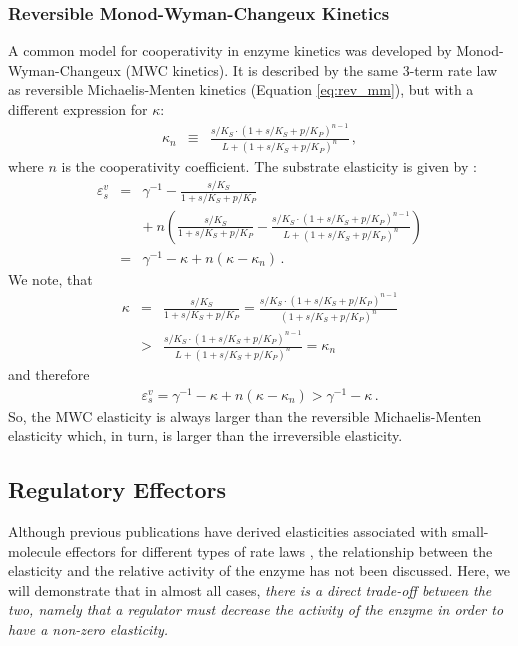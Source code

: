 \documentclass[12pt,a4paper]{article}
\begin{document}
\subsubsection{Reversible Monod-Wyman-Changeux Kinetics}
A common model for cooperativity in enzyme kinetics was developed by Monod-Wyman-Changeux (MWC kinetics). It is described by the same 3-term rate law as reversible Michaelis-Menten kinetics (Equation \ref{eq:rev_mm}), but with a different expression for $\kappa$:
\begin{eqnarray}
\kappa_n &\equiv& \frac{s/K_S \cdot (1 + s/K_S + p/K_P)^{n-1}}{L + (1 + s/K_S + p/K_P)^n} \,,
\end{eqnarray}
where $n$ is the cooperativity coefficient. The substrate elasticity is given by \cite{Rohwer2010-tx}:
\begin{eqnarray}
\varepsilon_{s}^v &=& \gamma^{-1} - \frac{s/K_S}{1 + s/K_S + p/K_P} \nonumber\\
&&+~n \left( \frac{s/K_S}{1 + s/K_S + p/K_P} - \frac{s/K_S \cdot (1 + s/K_S + p/K_P)^{n-1}}{L + (1 + s/K_S + p/K_P)^n}\right) \nonumber\\
&=& \gamma^{-1} - \kappa + n (\kappa -  \kappa_n)\,.
\end{eqnarray}
We note, that 
\begin{eqnarray}
\kappa &=& \frac{s/K_S}{1 + s/K_S + p/K_P} = \frac{s/K_S \cdot (1 + s/K_S + p/K_P)^{n-1}}{(1 + s/K_S + p/K_P)^n} \nonumber\\
&>& \frac{s/K_S \cdot (1 + s/K_S + p/K_P)^{n-1}}{L + (1 + s/K_S + p/K_P)^n} = \kappa_n
\end{eqnarray}
and therefore
\begin{eqnarray}
\varepsilon_{s}^v = \gamma^{-1} - \kappa + n (\kappa -  \kappa_n) > \gamma^{-1} - \kappa\,.
\end{eqnarray}
So, the MWC elasticity is always larger than the reversible Michaelis-Menten elasticity which, in turn, is larger than the irreversible elasticity.


\subsection{Regulatory Effectors}
Although previous publications have derived elasticities associated with small-molecule effectors for different types of rate laws \cite{Heinrich1974-yj, Liebermeister2010-vd}, the relationship between the elasticity and the relative activity of the enzyme has not been discussed. Here, we will demonstrate that in almost all cases, \emph{there is a direct trade-off between the two, namely that a regulator must decrease the activity of the enzyme in order to have a non-zero elasticity.}
\end{document}
